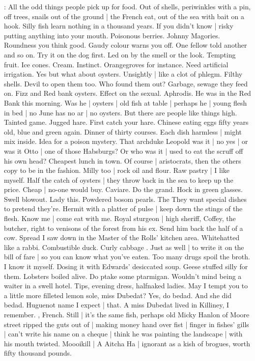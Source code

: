 \BloomInt:
All the odd things people pick up for food.
Out of shells,
periwinkles with a pin,
off trees,
snails out of the ground |
the French eat,
out of the sea with bait on a hook.
Silly fish learn nothing in a thousand years.
If you didn't know |
risky putting anything into your mouth.
Poisonous berries.
Johnny Magories.
Roundness you think good.
Gaudy colour warns you off.
One fellow told another and so on.
Try it on the dog first.
Led on by the smell or the look.
Tempting fruit.
Ice cones.
Cream.
Instinct.
Orangegroves for instance.
Need artificial irrigation.
Yes but what about oysters.
Unsightly |
like a clot of phlegm.
Filthy shells.
Devil to open them too.
Who found them out?
Garbage, sewage they feed on.
Fizz and Red bank oysters.
Effect on the sexual.
Aphrodis.
He was in the Red Bank this morning.
Was he |
oysters |
old fish at table |
perhaps he |
young flesh in bed |
no June has no ar |
no oysters.
But there are people like things high.
Tainted game.
Jugged hare.
First catch your hare.
Chinese eating eggs fifty years old,
blue and green again.
Dinner of thirty courses.
Each dish harmless |
might mix inside.
Idea for a poison mystery.
That archduke Leopold was it |
no yes |
or was it Otto |
one of those Habsburgs?
Or who was it |
used to eat the scruff off his own head?
Cheapest lunch in town.
Of course |
aristocrats,
then the others copy to be in the fashion.
Milly too |
rock oil and flour.
Raw pastry |
I like myself.
Half the catch of oysters |
they throw back in the sea to keep up the price.
Cheap |
no-one would buy.
Caviare.
Do the grand.
Hock in green glasses.
Swell blowout.
Lady this.
Powdered bosom pearls.
The 
They want special dishes to pretend they're.
Hermit with a platter of pulse |
keep down the stings of the flesh.
Know me |
come eat with me.
Royal sturgeon |
high sheriff,
Coffey, the butcher,
right to venisons of the forest from his ex.
Send him back the half of a cow.
Spread I saw down in the Master of the Rolls' kitchen area.
Whitehatted  like a rabbi.
Combustible duck.
Curly cabbage .
Just as well |
to write it on the bill of fare |
so you can know what you've eaten.
Too many drugs spoil the broth.
I know it myself.
Dosing it with Edwards' desiccated soup.
Geese stuffed silly for them.
Lobsters boiled alive.
Do ptake some ptarmigan.
Wouldn't mind being a waiter in a swell hotel.
Tips,
evening dress,
halfnaked ladies.
May I tempt you to a little more filleted lemon sole,
miss Dubedat?
Yes, do bedad.
And she did bedad.
Huguenot name I expect |
that.
A miss Dubedat lived in Killiney,
I remember.
, French.
Still |
it's the same fish,
perhaps old Micky Hanlon of Moore street ripped the guts out of |
making money hand over fist |
finger in fishes' gills |
can't write his name on a cheque |
think he was painting the landscape |
with his mouth twisted.
Moooikill |
A Aitcha Ha |
ignorant as a kish of brogues,
worth fifty thousand pounds.

